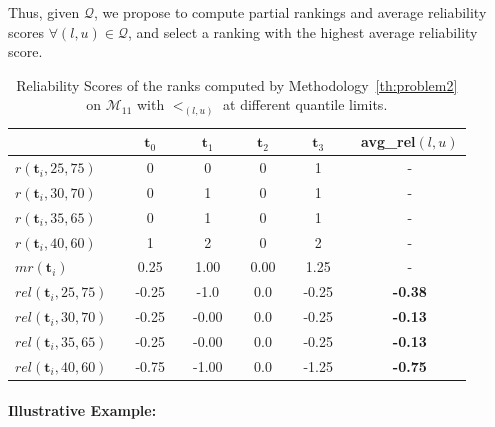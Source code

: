 \documentclass[acmsmall,screen, review]{acmart}
\begin{document}
Thus, given $\mathcal{Q}$, we propose to compute partial rankings and average reliability scores $\forall (l,u) \in \mathcal{Q}$, and select a ranking with the highest average reliability score. 

\begin{table}[h!]
	\centering
	\begin{adjustbox}{width=0.65\columnwidth,center}
		\begin{tabular}{@{}ll ccccccccc@{}}
			\toprule
			&&$\mathbf{t}_0$ &&$\mathbf{t}_1$ &&$\mathbf{t}_2$ &&$\mathbf{t}_3$ &&avg\_rel$(l,u)$ \\
			\midrule
			$r(\mathbf{t}_i,25,75)$&& 0&&0&&0&&1&&-\\
			$r(\mathbf{t}_i,30,70)$&& 0&&1&&0&&1&&-\\
			$r(\mathbf{t}_i,35,65)$&& 0&&1&&0&&1&&-\\
			$r(\mathbf{t}_i,40,60)$&& 1&&2&&0&&2&&-\\
			\midrule
			$mr(\mathbf{t}_i)$ &&0.25&&1.00&&0.00&&1.25&&-\\
			\midrule
			$rel(\mathbf{t}_i,25,75)$&& -0.25&&-1.0&&0.0&&-0.25&&\textbf{-0.38}\\
			$rel(\mathbf{t}_i,30,70)$&& -0.25&&-0.00&&0.0&&-0.25&&\textbf{-0.13}\\
			$rel(\mathbf{t}_i,35,65)$&& -0.25&&-0.00&&0.0&&-0.25&&\textbf{-0.13}\\
			$rel(\mathbf{t}_i,40,60)$&& -0.75&&-1.00&&0.0&&-1.25&&\textbf{-0.75}\\
			\bottomrule
		\end{tabular}
	\end{adjustbox}
	\caption{Reliability Scores of the ranks computed by Methodology~\ref{th:problem2} on $\mathcal{M}_{11}$ with $<_{(l,u)}$ at different quantile limits.}
	\label{tab:rel}
\end{table}

\paragraph{Illustrative Example:}
\end{document}
